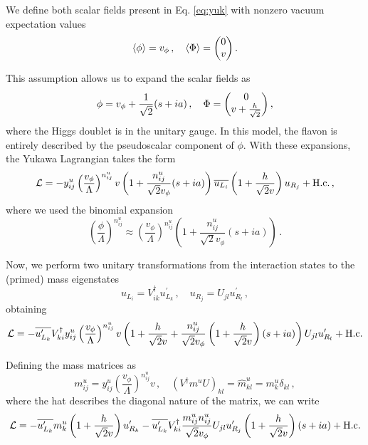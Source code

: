 \documentclass[prd,amsfonts,onecolumn,superscriptaddress,aps,nofootinbib,11pt]{revtex4-1}
\begin{document}
We define both scalar fields present in Eq. \ref{eq:yuk} with nonzero vacuum expectation values
\begin{equation}
	\expval{\phi} = v_\phi \,, \quad \expval{\Phi} = \mqty(0 \\ v) \,.
\end{equation}

This assumption allows us to expand the scalar fields as
\begin{equation}
	\phi = v_\phi + \frac{1}{\sqrt{2}}(s + ia) \,, \quad \Phi = \mqty(0 \\ v + \frac{h}{\sqrt{2}}) \,,
\end{equation}
where the Higgs doublet is in the unitary gauge. In this model, the flavon is entirely described by the pseudoscalar component of $\phi$. With these expansions, the Yukawa Lagrangian takes the form
\begin{equation}
	\mathcal{L} = -y_{ij}^u \left( \frac{v_\phi}{\Lambda} \right)^{n_{ij}^u}  v \left( 1 + \frac{n_{ij}^u}{\sqrt{2} v_\phi} (s + ia) \right) \overline{u_{L_i}} \left( 1 + \frac{h}{\sqrt{2}v} \right) u_{R_j} + \rm{H.c.} \,,
\end{equation}
where we used the binomial expansion
\begin{equation}
    \left( \frac{\phi}{\Lambda} \right)^{n_{ij}^u} \approx \left( \frac{v_{\phi}}{\Lambda} \right)^{n_{ij}^u} \left( 1 + \frac{n_{ij}^u}{\sqrt{2} v_{\phi}} (s + ia) \right) \,.
\end{equation}

Now, we perform two unitary transformations from the interaction states to the (primed) mass eigenstates
\begin{equation}
    u_{L_i} =  V^\dagger_{ik} u^{\prime}_{L_k} \,, \quad u_{R_j} = U_{jl} u_{R_l}^{\prime} \,,
\end{equation}
obtaining
\begin{equation}
    \mathcal{L} = - \overline{u_{L_k}^{\prime}} V^\dagger_{ki} y_{ij}^u \left( \frac{v_\phi}{ \Lambda} \right)^{n_{ij}^u} v \left( 1 + \frac{h}{\sqrt{2}v} + \frac{n_{ij}^u}{\sqrt{2} v_\phi} \left( 1 + \frac{h}{\sqrt{2}v} \right)  (s + ia) \right) U_{jl} u^{\prime}_{R_l} + \rm{H.c.}
\end{equation}

Defining the mass matrices as
\begin{equation}
    m_{ij}^u = y_{ij}^u \left( \frac{v_\phi}{\Lambda} \right)^{n_{ij}^u} v \,, \quad \left( V^\dagger m^u U \right)_{kl} = \hat{m}_{kl}^u = m_k^u \delta_{kl} \,,
\end{equation}
where the hat describes the diagonal nature of the matrix, we can write
\begin{equation}
    \mathcal{L} = -\overline{u_{L_k}^\prime} m_k^u \left( 1 + \frac{h}{\sqrt{2}v} \right) u_{R_k}^{\prime} - \overline{u_{L_k}^\prime} V^\dagger_{ki} \frac{m_{ij}^u n_{ij}^u }{\sqrt{2} v_\phi} U_{jl} u_{R_j}^{\prime} \left(1 + \frac{h}{\sqrt{2}v} \right)(s+ia) + \rm{H.c.}
\end{equation}
\end{document}
